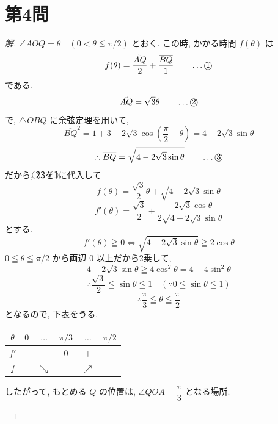 \documentclass[../main.tex]{subfiles}
\begin{document}
\section*{第4問}

\begin{proof}[解]
  $\angle AOQ = \theta \quad (0 < \theta \leqq \pi/2)$ とおく. この時, かかる時間 $f(\theta)$ は
  \[
    f(\theta) = \frac{\breve{AQ}}{2} + \frac{\overline{BQ}}{1} \qquad \dots \text{\textcircled{1}}
  \]
  である.
  \[
    \breve{AQ} = \sqrt{3} \theta \qquad \dots \text{\textcircled{2}}
  \]
  で, $\triangle OBQ$ に余弦定理を用いて,
  \[
    \overline{BQ}^2 = 1 + 3 - 2\sqrt{3} \cos\left(\frac{\pi}{2} - \theta\right) = 4 - 2\sqrt{3} \sin\theta
  \]
  \[
    \therefore \overline{BQ} = \sqrt{4 - 2\sqrt{3} \sin\theta} \qquad \dots \text{\textcircled{3}}
  \]
  だから, \textcircled{2}\textcircled{3}を\textcircled{1}に代入して
  \[
    f(\theta) = \frac{\sqrt{3}}{2} \theta + \sqrt{4 - 2\sqrt{3} \sin\theta}
  \]
  \[
    f'(\theta) = \frac{\sqrt{3}}{2} + \frac{-2\sqrt{3}\cos\theta}{2\sqrt{4 - 2\sqrt{3}\sin\theta}}
  \]
  とする.
  \[
    f'(\theta) \geqq 0 \iff \sqrt{4 - 2\sqrt{3} \sin\theta} \geqq 2 \cos\theta
  \]
  $0 \leqq \theta \leqq \pi/2$ から両辺 $0$ 以上だから2乗して,
  \[
    4 - 2\sqrt{3} \sin\theta \geqq 4 \cos^2\theta = 4 - 4 \sin^2\theta
  \]
  \[
    \therefore \frac{\sqrt{3}}{2} \leqq \sin\theta \leqq 1 \quad (\because 0 \leqq \sin\theta \leqq 1)
  \]
  \[
    \therefore \frac{\pi}{3} \leqq \theta \leqq \frac{\pi}{2}
  \]
  となるので, 下表をうる.

  \begin{center}
    \begin{tabular}{c|ccccc}
      $\theta$ & $0$ & $\dots$ & $\pi/3$ & $\dots$ & $\pi/2$ \\ \hline
      $f'$ & & $-$ & $0$ & $+$ & \\ \hline
      $f$ & & $\searrow$ & & $\nearrow$ &
    \end{tabular}
  \end{center}

  したがって, もとめる $Q$ の位置は, $\angle QOA = \dfrac{\pi}{3}$ となる場所.

  \begin{center}
\end{center}
\end{proof}
\end{document}
